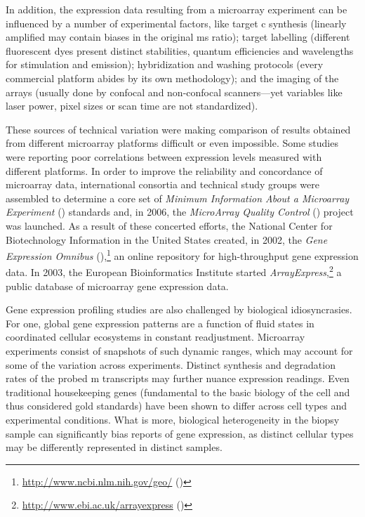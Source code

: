\medskip

In addition, the expression data resulting from a microarray experiment can be
influenced by a number of experimental factors, like target c
synthesis (linearly amplified  may contain biases in the original
ms ratio);\cite{nygaard_options_2006} target labelling (different
fluorescent dyes present distinct stabilities, quantum efficiencies and
wavelengths for stimulation and emission); hybridization and washing protocols
(every commercial platform abides by its own methodology); and the imaging of
the arrays (usually done by confocal and non-confocal scanners---yet variables
like laser power, pixel sizes or scan time are not standardized).

These sources of technical variation were making comparison of results obtained
from different microarray platforms difficult or even impossible.  Some studies
were reporting poor correlations between expression levels measured with
different platforms.\cite{tan_evaluation_2003,shi_cross-platform_2005} In order
to improve the reliability and concordance of microarray data, international
consortia and technical study groups were assembled to determine a core set of
\emph{Minimum Information About a Microarray Experiment} ()
standards\cite{brazma_minimum_2001} and, in 2006, the \emph{MicroArray Quality
  Control} () project was
launched.\cite{maqc_consortium_microarray_2006} As a result of these concerted
efforts, the National Center for Biotechnology Information in the United States
created, in 2002, the \emph{Gene Expression Omnibus}
(),\footnote{\url{http://www.ncbi.nlm.nih.gov/geo/}
  (\citealp{edgar_gene_2002})} an online repository for \mbox{high-throughput}
gene expression data.  In 2003, the European Bioinformatics Institute started
\emph{ArrayExpress},\footnote{\url{http://www.ebi.ac.uk/arrayexpress}
  (\citealp{brazma_arrayexpress--public_2003})} a public database of microarray
gene expression data.

Gene expression profiling studies are also challenged by biological
idiosyncrasies.  For one, global gene expression patterns are a function of
fluid states in coordinated cellular ecosystems in constant readjustment.
Microarray experiments consist of snapshots of such dynamic ranges, which may
account for some of the variation across experiments.  Distinct synthesis and
degradation rates of the probed m transcripts may further nuance
expression readings.  Even traditional housekeeping genes (fundamental to the
basic biology of the cell and thus considered gold standards) have been shown to
differ across cell types and experimental conditions.\cite{thorrez_using_2008}
What is more, biological heterogeneity in the biopsy sample can significantly
bias reports of gene expression, as distinct cellular types may be differently
represented in distinct samples.

